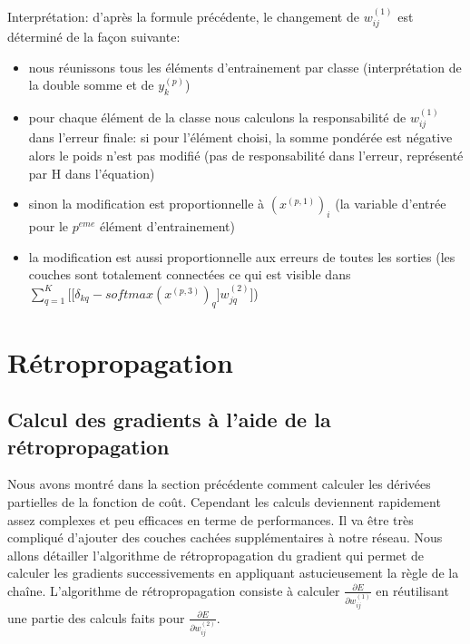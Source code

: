 \documentclass[a4paper,11pt,oneside,roman]{article}
\begin{document}


    Interprétation:
    d'après la formule précédente, le changement de $w_{ij}^{(1)}$ est déterminé de la façon suivante:
    \begin{itemize}
        \item nous réunissons tous les éléments d'entrainement par classe (interprétation de la double somme et de $y_k^{(p)}$)
        \item pour chaque élément de la classe nous calculons la responsabilité de $w_{ij}^{(1)}$ dans l'erreur finale: si pour l'élément choisi, la somme pondérée est négative alors le poids n'est pas modifié (pas de responsabilité dans l'erreur, représenté par H dans l'équation)
        \item sinon la modification est proportionnelle à $(x^{(p,1)})_i$ (la variable d'entrée pour le $p^{eme}$ élément d'entrainement) 
        \item la modification est aussi proportionnelle aux erreurs de toutes les sorties (les couches sont totalement connectées ce qui est visible dans $\sum\limits_{q=1}^{K} \bigg[ \big[ \delta_{kq} - softmax(x^{(p,3)})_q \big] w_{jq}^{(2)} \bigg]$)
    \end{itemize}

    \section{Rétropropagation}
    \subsection{Calcul des gradients à l'aide de la rétropropagation}
    Nous avons montré dans la section précédente comment calculer les dérivées partielles de la fonction de coût. Cependant les calculs deviennent rapidement assez complexes et peu efficaces en terme de performances.
    Il va être très compliqué d'ajouter des couches cachées supplémentaires à notre réseau.
    Nous allons détailler l'algorithme de rétropropagation du gradient qui permet de calculer les gradients successivements en appliquant astucieusement la règle de la chaîne.
    L'algorithme de rétropropagation consiste à calculer $\frac{\partial E}{\partial w_{ij}^{(1)}}$ en réutilisant une partie des calculs faits pour $\frac{\partial E}{\partial w_{ij}^{(2)}}$.
\end{document}
